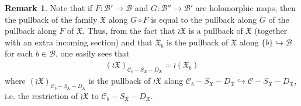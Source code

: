 \documentclass[11pt,b5paper,notitlepage]{article}
\theoremstyle{definition}
\newtheorem{rem}[df]{Remark}
\theoremstyle{plain}
\newcommand{\fk}{\mathfrak}
\newcommand{\mc}{\mathcal}
\newcommand{\SX}{{S_{\fk X}}}
\newcommand{\DX}{D_{\fk X}}
\newcommand{\<}{\left\langle}
\renewcommand{\>}{\right\rangle}
\newcommand{\MC}{\mathcal{C}}
\newcommand{\MB}{\mathcal{B}}
\newcommand{\fx}{\mathfrak{X}}
\numberwithin{equation}{subsection}
\begin{document}
\begin{comment}
The fiber of the propagated family $\wr\fx$ is described as follows. Let $c\in \wr\MB=\MC-S_\fx-D_\fx$ and $b=\pi(c)$. Then it is easy to see that
$$
(\wr\fx)_c=\Big(\tau_1(b),\cdots,\tau_M(b);\theta_1|_{\mc C_b},\dots,\theta_M|_{\mc C_b}\Big|\MC_b\Big|c,\varsigma_1(b),\cdots,\varsigma_N(b)\Big),
$$
On the other hand, applying Def. \ref{propagatedfamily} to the data $\fk X_b$, we have
\begin{align}
\wr(\fx_b)=\Big(&\wr(\tau_1(b)),\cdots,\wr(\tau_M(b));\wr(\theta_1|_{\mc C_b}),\dots,\wr(\theta_M|_{\mc C_b})\Big|   \nonumber\\
&\wr\pi':\MC_b\times \big(\MC_b-S_\fx(b)-D_\fx(b)\big)\rightarrow \MC_b-S_\fx(b)-D_\fx(b)\Big|\sigma_b,\wr(\varsigma_1(b)),\cdots,\wr(\varsigma_N(b))\Big)  \label{eq51}
\end{align}
\end{comment}


\begin{rem}\label{fiberpropagation}
Note that if $F:\mc B'\rightarrow\mc B$ and $G:\mc B''\rightarrow\mc B'$ are holomorphic maps, then the pullback of the family $\fk X$ along $G\circ F$ is equal to the pullback along $G$ of the pullback along $F$ of $\fk X$. Thus, from the fact that $\wr\fk X$ is a pullback of $\fk X$ (together with an extra incoming section) and that $\fk X_b$ is the pullback of $\fk X$ along $\{b\}\hookrightarrow \mc B$ for each $b\in\mc B$, one easily sees that
\begin{align}
(\wr\fk X)_{\mc C_b-\SX-\DX}=\wr(\fx_b)  \label{eq58}
\end{align}
where $(\wr\fk X)_{\mc C_b-\SX-\DX}$ is the pullback of $\wr\fk X$ along $\mc C_b-\SX-\DX\hookrightarrow\mc C-\SX-\DX$, i.e. the restriction of $\wr\fk X$ to $\mc C_b-\SX-\DX$.
\end{rem}
\end{document}
